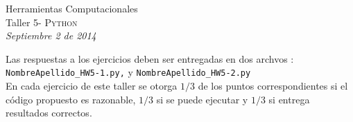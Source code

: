 \documentclass[11pt,letterpaper]{exam}
\begin{document}
\begin{center}
{\Large Herramientas Computacionales} \\
Taller 5- \textsc{Python} \\
{\small \it Septiembre 2 de 2014}
\end{center}



\vspace{1cm}

Las respuestas a los ejercicios deben ser entregadas en dos archvos : \verb+NombreApellido_HW5-1.py,+ y \verb+NombreApellido_HW5-2.py+\\

En cada ejercicio de este taller se otorga $1/3$ de los puntos correspondientes si el código propuesto es razonable, $1/3$ si se puede ejecutar y $1/3$ si entrega resultados correctos.
\end{document}
